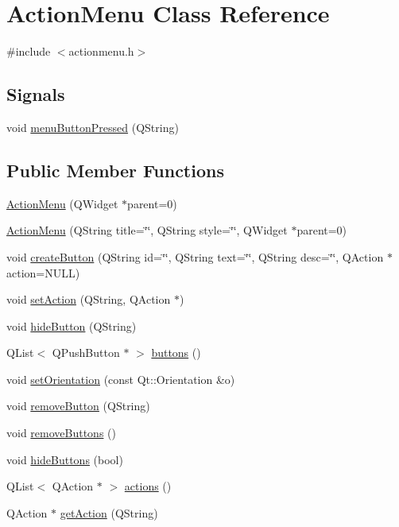 \hypertarget{classActionMenu}{
\section{ActionMenu Class Reference}
\label{classActionMenu}
}


{\ttfamily \#include $<$actionmenu.h$>$}

\subsection*{Signals}
\begin{DoxyCompactItemize}
\item 
void \hyperlink{classActionMenu_a173cbad1d02c27905563e80eeba3ca9f}{menuButtonPressed} (QString)
\end{DoxyCompactItemize}
\subsection*{Public Member Functions}
\begin{DoxyCompactItemize}
\item 
\hyperlink{classActionMenu_a702a96aca8b51697d55d1a97396c7776}{ActionMenu} (QWidget $\ast$parent=0)
\item 
\hyperlink{classActionMenu_aa5226e4b5b902f5857274f20ff594a74}{ActionMenu} (QString title=\char`\"{}\char`\"{}, QString style=\char`\"{}\char`\"{}, QWidget $\ast$parent=0)
\item 
void \hyperlink{classActionMenu_aad5a9530b92a300c0bcfb5671b5be868}{createButton} (QString id=\char`\"{}\char`\"{}, QString text=\char`\"{}\char`\"{}, QString desc=\char`\"{}\char`\"{}, QAction $\ast$action=NULL)
\item 
void \hyperlink{classActionMenu_ae80a3c156af75468db09bc4de9a9476a}{setAction} (QString, QAction $\ast$)
\item 
void \hyperlink{classActionMenu_ae79b45ab7a21c6b907c5dd013fca1657}{hideButton} (QString)
\item 
QList$<$ QPushButton $\ast$ $>$ \hyperlink{classActionMenu_a20e4afb9ee2a392e70a846685285809a}{buttons} ()
\item 
void \hyperlink{classActionMenu_a22e541a44d329c4c3436e80bab89145e}{setOrientation} (const Qt::Orientation \&o)
\item 
void \hyperlink{classActionMenu_a057543db1dfd0df7cd154f94064a2324}{removeButton} (QString)
\item 
void \hyperlink{classActionMenu_a57b228151344e9fd7fe3eb94174469c6}{removeButtons} ()
\item 
void \hyperlink{classActionMenu_a1c953fd1e69e7057c0a4d1eb7323208b}{hideButtons} (bool)
\item 
QList$<$ QAction $\ast$ $>$ \hyperlink{classActionMenu_a44ba9130999e74857a8f571e78da63de}{actions} ()
\item 
QAction $\ast$ \hyperlink{classActionMenu_a29c473d325be2186531fcf9b281ac5f5}{getAction} (QString)
\end{DoxyCompactItemize}
